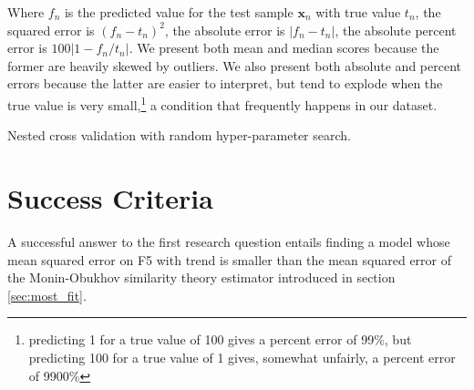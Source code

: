 \documentclass[12pt]{book}
\begin{document}
Where $f_n$ is the predicted value for the test sample $\bm x_n$ with true value $t_n$, the squared error is $(f_n-t_n)^2$, the absolute error is $\vert f_n-t_n\vert$, the absolute percent error is $100\vert 1-f_n/t_n\vert$. We present both mean and median scores because the former are heavily skewed by outliers. We also present both absolute and percent errors because the latter are easier to interpret, but tend to explode when the true value is very small,\footnote{predicting 1 for a true value of 100 gives a percent error of 99\%, but predicting 100 for a true value of 1 gives, somewhat unfairly, a percent error of 9900\%} a condition that frequently happens in our dataset.


\begin{algorithm}
\caption{Nested cross validation with random hyper-parameter search.}

\label{alg:nested_cv}
\begin{algorithmic}

		\EndFor

		\EndIf		
	\EndFor

\EndFor
{}
\end{algorithmic}
\end{algorithm}

\section{Success Criteria}
\label{sec:success}
A successful answer to the first research question entails finding a model whose mean squared error on F5 with trend is smaller than the mean squared error of the Monin-Obukhov similarity theory estimator introduced in section \ref{sec:most_fit}.
\end{document}
